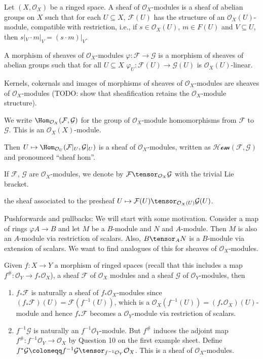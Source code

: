Let $(X, \mathcal{O}_X)$ be a ringed space. A sheaf of  $\mathcal{O}_X$-modules
is a sheaf of abelian groups on $X$ such that for each $U \subseteq X$, $\mathcal{F}(U)$
has the structure of an $\mathcal{O}_X(U)$-module, compatible with restriction,
i.e., if $s \in \mathcal{O}_X(U)$, $m \in F(U)$ and $V \subseteq U$, then
$s|_V\cdot m|_V = (s\cdot m)|_V$.

A morphism of sheaves of $\mathcal{O}_X$-modules $\varphi\colon \mathcal{F}\to \mathcal{G}$
is a morphism of sheaves of abelian groups such that for all $U \subseteq X$
$\varphi_U\colon \mathcal{F}(U)\to \mathcal{G}(U)$ is $\mathcal{O}_X(U)$-linear.

Kernels, cokernals and images of morphisms of sheaves of $\mathcal{O}_X$-modules
are sheaves of $\mathcal{O}_X$-modules (TODO: show that sheafification retains the
$\mathcal{O}_X$-module structure).

We write $\Hom_{\mathcal{O}_X}(\mathcal{F}, \mathcal{G})$ for the group of
$\mathcal{O}_X$-module homomorphisms from $\mathcal{F}$ to $\mathcal{G}$.
This is an $\mathcal{O}_X(X)$-module.

Then $U\mapsto \Hom_{\mathcal{O}_U}(\mathcal{F}|_U, \mathcal{G}|_U)$ is a sheaf
of $\mathcal{O}_X$-modules, written as $\mathcal{Hom}(\mathcal{F}, \mathcal{G})$
and pronounced \enquote{sheaf hom}.

If $\mathcal{F}$, $\mathcal{G}$ are $\mathcal{O}_X$-modules, we denote by
$\mathcal{F}\tensor_{\mathcal{O}_X} \mathcal{G}$ with the trivial Lie bracket.

the sheaf associated to the
presheaf $U\mapsto \mathcal{F}(U) \tensor_{\mathcal{O}_X(U)} \mathcal{G}(U)$.

Pushforwards and pullbacks: We will start with some motivation.
Consider a map of rings $\varphi A\to B$ and let $M$ be a
$B$-module and $N$ and $A$-module. Then $M$ is also an $A$-module via restriction
of scalars. Also, $B\tensor_A N$ is a $B$-module via extension of scalars. We
want to find analogues of this for sheaves of $\mathcal{O}_X$-modules.

Given $f\colon X\to Y$ a morphism of ringed spaces (recall that this includes
a map $f^\#\colon \mathcal{O}_Y \to f_*\mathcal{O}_X$), a sheaf $\mathcal{F}$ of
$\mathcal{O}_X$ modules and a sheaf $\mathcal{G}$ of $\mathcal{O}_Y$-modules,
then
\begin{enumerate}
	\item $f_*\mathcal{F}$ is naturally a sheaf of $f_*\mathcal{O}_X$-modules since
		$(f_*\mathcal{F})(U)  = \mathcal{F}(f^{-1}(U))$, which is a
		 $\mathcal{O}_X(f^{-1}(U)) = (f_*\mathcal{O}_X)(U)$-module and hence
		 $f_*\mathcal{F}$ becomes a $\mathcal{O}_Y$-module via restriction of
		 scalars.
	\item $f^{-1}\mathcal{G}$ is naturally an $f^{-1}\mathcal{O}_Y$-module. But
		$f^\#$ induces the adjoint map $f^\#\colon f^{-1}\mathcal{O}_Y\to \mathcal{O}_X$
		by Question 10 on the first example sheet.
		Define $f^*\mathcal{G}\coloneqq f^{-1}\mathcal{G}\tensor_{f^{-1}\mathcal{O}_Y}\mathcal{O}_X$.
		This is a sheaf of $\mathcal{O}_X$-modules.
\end{enumerate}
